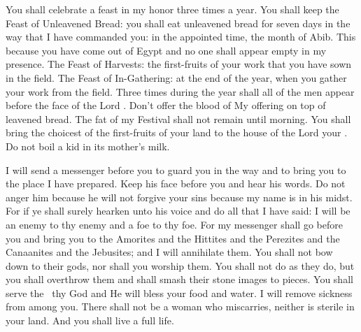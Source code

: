 \begin{inparaenum}
   You shall celebrate a feast in my honor three times a year.%
   You shall keep the Feast of Unleavened Bread: you shall eat unleavened bread for seven days in the way that I have commanded you: in the appointed time, the month of Abib. This because you have come out of Egypt and no one shall appear empty in my presence.%
   The Feast of Harvests: the first-fruits of your work that you have sown in the field. The Feast of In-Gathering: at the end of the year, when you gather your work from the field.%
   Three times during the year shall all of the men appear before the face of the Lord \god.%
   Don't offer the blood of My offering on top of leavened bread. The fat of my Festival shall not remain until morning.%
   You shall bring the choicest of the first-fruits of your land to the house of the Lord your \god. Do not boil a kid in its mother's milk.%

   I will send a messenger before you to guard you in the way and to bring you to the place I have prepared.%
   Keep his face before you and hear his words. Do not anger him because he will not forgive your sins because my name is in his midst.%
   For if ye shall surely hearken unto his voice and do all that I have said: I will be an enemy to thy enemy and a foe to thy foe.%
   For my messenger shall go before you and bring you to the Amorites and the Hittites and the Perezites and the Canaanites and the Jebusites; and I will annihilate them.%
   You shall not bow down to their gods, nor shall you worship them. You shall not do as they do, but you shall overthrow them and shall smash their stone images to pieces.%
   You shall serve the \lord\ thy God and He will bless your food and water. I will remove sickness from among you.%
   There shall not be a woman who miscarries, neither is sterile in your land. And you shall live a full life.%


\end{inparaenum}
